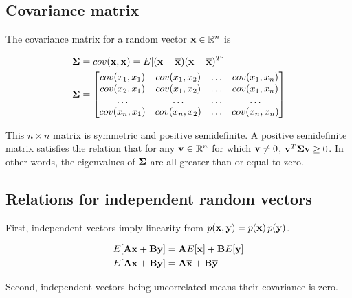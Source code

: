 \subsection{Covariance matrix}

The covariance matrix for a random vector $\mathbf{x} \in \mathbb{R}^n$ is

\begin{align*}
  \mathbf{\Sigma} &= cov(\mathbf{x}, \mathbf{x}) = E[(\mathbf{x} - \overline{\mathbf{x}})
    (\mathbf{x} - \overline{\mathbf{x}})^T] \\
  \mathbf{\Sigma} &= \begin{bmatrix}
    cov(x_1, x_1) & cov(x_1, x_2) & \ldots & cov(x_1, x_n) \\
    cov(x_2, x_1) & cov(x_1, x_2) & \ldots & cov(x_1, x_n) \\
    \ldots        & \ldots        & \ldots & \ldots \\
    cov(x_n, x_1) & cov(x_n, x_2) & \ldots & cov(x_n, x_n) \\
  \end{bmatrix}
\end{align*}

This $n \times n$ matrix is symmetric and positive semidefinite. A positive
semidefinite matrix satisfies the relation that for any
$\mathbf{v} \in \mathbb{R}^n$ for which $\mathbf{v} \neq 0$,
$\mathbf{v}^T \mathbf{\Sigma} \mathbf{v} \geq 0$. In other words, the eigenvalues of
$\mathbf{\Sigma}$ are all greater than or equal to zero.

\subsection{Relations for independent random vectors}

First, independent vectors imply linearity from
$p(\mathbf{x}, \mathbf{y}) = p(\mathbf{x}) \,p(\mathbf{y})$.

\begin{align*}
  E[\mathbf{A}\mathbf{x} + \mathbf{B}\mathbf{y}] &= \mathbf{A}E[\mathbf{x}] + \mathbf{B}E[\mathbf{y}] \\
  E[\mathbf{A}\mathbf{x} + \mathbf{B}\mathbf{y}] &= \mathbf{A}\overline{\mathbf{x}} + \mathbf{B}\overline{\mathbf{y}}
\end{align*}

Second, independent vectors being uncorrelated means their covariance is zero.

